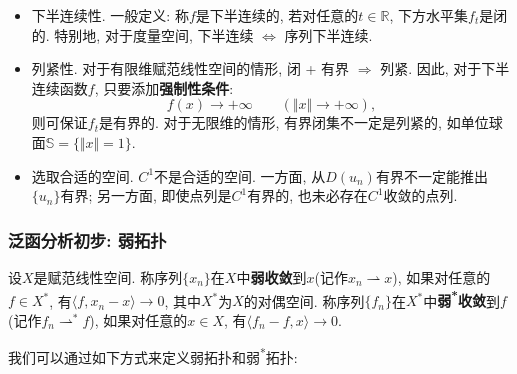 \begin{itemize}
    \item 下半连续性. 一般定义: 称$f$是下半连续的, 若对任意的$t \in \mathbb{R}$, 下方水平集$f_t$是闭的.
    特别地, 对于度量空间, 下半连续 $\Leftrightarrow$ 序列下半连续.
    \item 列紧性. 对于有限维赋范线性空间的情形, 闭 + 有界 $\Rightarrow$ 列紧. 因此, 对于下半连续函数$f$, 只要添加\textbf{强制性条件}:
    \begin{equation*}
        f(x) \rightarrow +\infty \qquad (\Vert x \Vert \rightarrow +\infty),
    \end{equation*}
    则可保证$f_t$是有界的. 对于无限维的情形, 有界闭集不一定是列紧的, 如单位球面$\mathbb{S} = \{\Vert x \Vert = 1\}$.
    \item 选取合适的空间. $C^1$不是合适的空间. 一方面, 从$D(u_n)$有界不一定能推出$\{u_n\}$有界; 另一方面, 即使点列是$C^1$有界的, 也未必存在$C^1$收敛的点列.
\end{itemize}

\subsubsection{泛函分析初步: 弱拓扑}

\begin{definition}\label{def2.3}
    设$X$是赋范线性空间. 称序列$\{x_n\}$在$X$中\textbf{弱收敛}到$x$(记作$x_n \rightharpoonup x$), 如果对任意的$f \in X^*$, 有$\langle f, x_n - x\rangle \rightarrow 0$, 其中$X^*$为$X$的对偶空间.
    称序列$\{f_n\}$在$X^*$中\textbf{弱\textsuperscript{*}收敛}到$f$(记作$f_n \rightharpoonup^* f$), 如果对任意的$x \in X$, 有$\langle f_n - f, x\rangle \rightarrow 0$.
\end{definition}

我们可以通过如下方式来定义弱拓扑和弱\textsuperscript{*}拓扑: 

